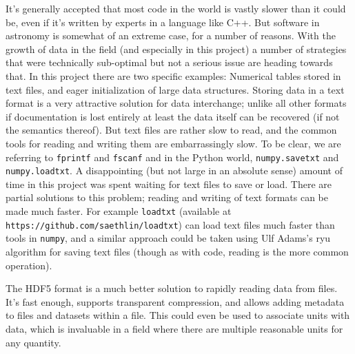 It's generally accepted that most code in the world is vastly slower than it could be, even if it's written by experts in a language like C++.
But software in astronomy is somewhat of an extreme case, for a number of reasons.
With the growth of data in the field (and especially in this project) a number of strategies that were technically sub-optimal but not a serious issue are heading towards that.
In this project there are two specific examples: Numerical tables stored in text files, and eager initialization of large data structures.
Storing data in a text format is a very attractive solution for data interchange; unlike all other formats if documentation is lost entirely at least the data itself can be recovered (if not the semantics thereof).
But text files are rather slow to read, and the common tools for reading and writing them are embarrassingly slow. To be clear, we are referring to \lstinline{fprintf} and \lstinline{fscanf} and in the Python world, \lstinline{numpy.savetxt} and \lstinline{numpy.loadtxt}.
A disappointing (but not large in an absolute sense) amount of time in this project was spent waiting for text files to save or load.
There are partial solutions to this problem; reading and writing of text formats can be made much faster.
For example \lstinline{loadtxt} (available at \lstinline{https://github.com/saethlin/loadtxt}) can load text files much faster than tools in \lstinline{numpy}, and a similar approach could be taken using Ulf Adams's ryu algorithm for saving text files (though as with code, reading is the more common operation).

The HDF5 format is a much better solution to rapidly reading data from files.
It's fast enough, supports transparent compression, and allows adding metadata to files and datasets within a file.
This could even be used to associate units with data, which is invaluable in a field where there are multiple reasonable units for any quantity.

